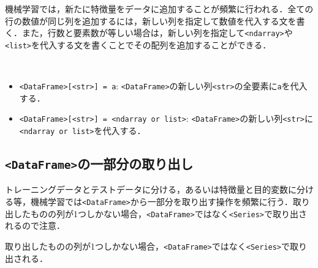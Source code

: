 機械学習では，新たに特徴量をデータに追加することが頻繁に行われる．全ての行の数値が同じ列を追加するには，新しい列を指定して数値を代入する文を書く．また，行数と要素数が等しい場合は，新しい列を指定して\texttt{<ndarray>}や\texttt{<list>}を代入する文を書くことでその配列を追加することができる．

\begin{gram}　
\begin{itemize}
\item \texttt{<DataFrame>[<str>] = a}: \texttt{<DataFrame>}の新しい列\texttt{<str>}の全要素に\texttt{a}を代入する．
\item \texttt{<DataFrame>[<str>] = <ndarray or list>}: \texttt{<DataFrame>}の新しい列\texttt{<str>}に\texttt{<ndarray or list>}を代入する．
\end{itemize}
\end{gram}
\begin{cod}[\texttt{pd3.py}]　
}]{code/pd3.py}
\vspace{-10pt}
\begin{lstlisting}
df=
   population   profit  all_1  ndarray  list
0      6.1101  17.5920      1        0     0
1      5.5277   9.1302      1        1     1
2      8.5186  13.6620      1        2     2
3      7.0032  11.8540      1        3     3
4      5.8598   6.8233      1        4     4
\end{lstlisting}
\end{cod}
\vspace{-10pt}

\subsection{\texttt{<DataFrame>}の一部分の取り出し}

トレーニングデータとテストデータに分ける，あるいは特徴量と目的変数に分ける等，機械学習では\texttt{<DataFrame>}から一部分を取り出す操作を頻繁に行う．取り出したものの列が1つしかない場合，\texttt{<DataFrame>}ではなく\texttt{<Series>}で取り出されるので注意．

\begin{rem}
取り出したものの列が1つしかない場合，\texttt{<DataFrame>}ではなく\texttt{<Series>}で取り出される．
\end{rem}

